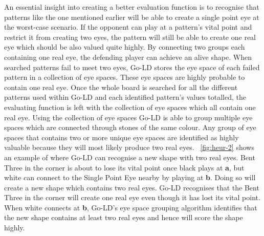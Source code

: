 \documentclass{l4proj}
\newcommand{\bo}[1]{\textbf{#1}}
\begin{document}
An essential insight into creating a better evaluation function is to recognise that patterns like the one mentioned earlier will be able to create a single point eye at the worst-case scenario. If the opponent can play at a pattern's vital point and restrict it from creating two eyes, the pattern will still be able to create one real eye which should be also valued quite highly. By connecting two groups each containing one real eye, the defending player can achieve an alive shape. When searched patterns fail to meet two eyes, Go-LD stores the eye space of each failed pattern in a collection of eye spaces. These eye spaces are highly probable to contain one real eye. Once the whole board is searched for all the different patterns used within Go-LD and each identified pattern's values totalled, the evaluating function is left with the collection of eye spaces which all contain one real eye. Using the collection of eye spaces Go-LD is able to group multiple eye spaces which are connected through stones of the same colour. Any group of eye spaces that contains two or more unique eye spaces are identified as highly valuable because they will most likely produce two real eyes.
~\autoref{fig:heur-2} shows an example of where Go-LD can recognise a new shape with two real eyes. Bent Three in the corner is about to lose its vital point once black plays at \bo{a}, but white can connect to the Single Point Eye nearby by playing at \bo{b}. Doing so will create a new shape which contains two real eyes. Go-LD recognises that the Bent Three in the corner will create one real eye even though it has lost its vital point. When white connects at \bo{b}, Go-LD's eye space grouping algorithm identifies that the new shape contains at least two real eyes and hence will score the shape highly.
\end{document}
